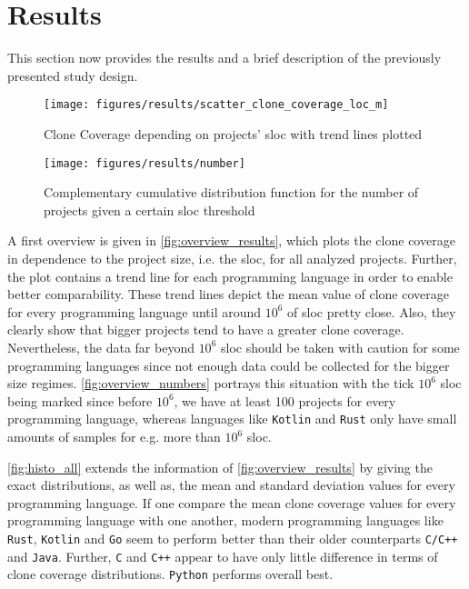 
\section{Results}
\label{sec:results}

This section now provides the results and a brief description of the previously presented study design. 

\begin{figure}[tbh!]
	\centering
	\texttt{[image: figures/results/scatter\_clone\_coverage\_loc\_m]}
	\caption{Clone Coverage depending on projects' \ac{sloc} with trend lines plotted}
	\label{fig:overview_results}
\end{figure}

\begin{figure}[tbh!]
	\centering
	\texttt{[image: figures/results/number]}
	\caption{Complementary cumulative distribution function for the number of projects given a certain \ac{sloc} threshold}
	\label{fig:overview_numbers}
\end{figure}

A first overview is given in \autoref{fig:overview_results}, which plots the clone coverage in dependence to the project size, i.e. the \acl{sloc}, for all analyzed projects. Further, the plot contains a trend line for each programming language in order to enable better comparability. These trend lines depict the mean value of clone coverage for every programming language until around $10^6$ of \ac{sloc} pretty close. Also, they clearly show that bigger projects tend to have a greater clone coverage.
Nevertheless, the data far beyond $10^6$ \acl{sloc} should be taken with caution for some programming languages since not enough data could be collected for the bigger size regimes. 
\autoref{fig:overview_numbers} portrays this situation with the tick $10^6$ \ac{sloc} being marked since before $10^6$, we have at least 100 projects for every programming language, whereas languages like \texttt{Kotlin} and \texttt{Rust} only have small amounts of samples for e.g. more than $10^6$ \ac{sloc}.

\autoref{fig:histo_all} extends the information of \autoref{fig:overview_results} by giving the exact distributions, as well as, the mean and standard deviation values for every programming language. If one compare the mean clone coverage values for every programming language with one another, modern programming languages like \texttt{Rust}, \texttt{Kotlin} and \texttt{Go} seem to perform better than their older counterparts \texttt{C/C++} and \texttt{Java}. Further, \texttt{C} and \texttt{C++} appear to have only little difference in terms of clone coverage distributions. \texttt{Python} performs overall best.

